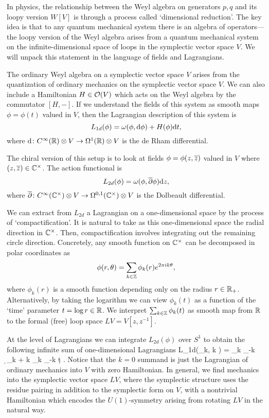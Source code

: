\documentclass[11pt]{amsart}
\begin{document}
In physics, the relationship between the Weyl algebra on generators $p,q$ and its loopy version $W[V]$ is through a process called `dimensional reduction'.
The key idea is that to any quantum mechanical system there is an algebra of operators---the loopy version of the Weyl algebra arises from a quantum mechanical system on the infinite-dimensional space of loops in the symplectic vector space $V$. 
We will unpack this statement in the language of fields and Lagrangians.

The ordinary Weyl algebra on a symplectic vector space $V$ arises from the quantization of ordinary mechanics on the symplectic vector space $V$.
We can also include a Hamiltonian $H \in \mathcal O(V)$ which acts on the Weyl algebra by the commutator $[H,-]$.
If we understand the fields of this system as smooth maps $\phi = \phi(t)$ valued in $V$, then the Lagrangian description of this system is 
\[
L_{1d} (\phi) = \omega(\phi , {\rm d} \phi) + H(\phi) {\rm d} t ,
\]
where ${\rm d} \colon C^\infty(\mathbb R) \otimes V \to \Omega^1(\mathbb R) \otimes V$ is the de Rham differential. 

The chiral version of this setup is to look at fields $\phi = \phi(z,{\overline{z}})$ valued in $V$ where $(z,{\overline{z}}) \in \mathbb C^\times$.
The action functional is 
\[
L_{2d}(\phi) = \omega(\phi, {\overline{\partial}} \phi) {\rm d} z ,
\]
where ${\overline{\partial}} \colon C^\infty(\mathbb C^\times)\otimes V \to \Omega^{0,1}(\mathbb C^\times) \otimes V$ is the Dolbeault differential.

We can extract from $L_{2d}$ a Lagrangian on a one-dimensional space by the process of `compactification'. 
It is natural to take as this one-dimensional space the radial direction in $\mathbb C^\times$.
Then, compactification involves integrating out the remaining circle direction.
Concretely, any smooth function on $\mathbb C^\times$ can be decomposed in polar coordinates as
\[
\phi(r,\theta) = \sum_{k \in \mathbb Z} \phi_k(r) e^{2 \pi i k \theta} ,
\]
where $\phi_k(r)$ is a smooth function depending only on the radius $r \in \mathbb R_+$.
Alternatively, by taking the logarithm we can view $\phi_k(t)$ as a function of the `time' parameter $t = \log r \in \mathbb R$. 
We interpret $\sum_{k \in \mathbb Z} \phi_k(t)$ as smooth map from $\mathbb R$ to the formal (free) loop space $LV = V[z,z^{-1}]$. 

At the level of Lagrangians we can integrate $L_{2d}(\phi)$ over $S^1$ to obtain the following infinite sum of one-dimensional Lagrangians
\beqn
L_{1d}(\phi_k, k \in \ZZ) = \sum_{k\in \ZZ} \phi_{-k} \d \phi_{k} + k \phi_k \phi_{-k} \d t .
\eeqn 
Notice that the $k=0$ summand is just the Lagrangian of ordinary mechanics into $V$ with zero Hamiltonian. 
In general, we find mechanics into the symplectic vector space $LV$, where the symplectic structure uses the residue pairing in addition to the symplectic form on $V$, with a nontrivial Hamiltonian which encodes the $U(1)$-symmetry arising from rotating $LV$ in the natural way.
\end{document}
